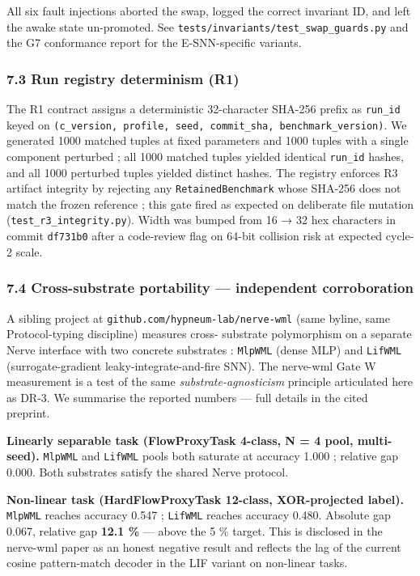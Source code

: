\documentclass[
]{article}
\begin{document}
All six fault injections aborted the swap, logged the correct invariant
ID, and left the awake state un-promoted. See
\texttt{tests/invariants/test\_swap\_guards.py} and the G7 conformance
report for the E-SNN-specific variants.

\subsubsection{7.3 Run registry determinism
(R1)}\label{run-registry-determinism-r1}

The R1 contract assigns a deterministic 32-character SHA-256 prefix as
\texttt{run\_id} keyed on
\texttt{(c\_version,\ profile,\ seed,\ commit\_sha,\ benchmark\_version)}.
We generated 1000 matched tuples at fixed parameters and 1000 tuples
with a single component perturbed ; all 1000 matched tuples yielded
identical \texttt{run\_id} hashes, and all 1000 perturbed tuples yielded
distinct hashes. The registry enforces R3 artifact integrity by
rejecting any \texttt{RetainedBenchmark} whose SHA-256 does not match
the frozen reference ; this gate fired as expected on deliberate file
mutation (\texttt{test\_r3\_integrity.py}). Width was bumped from 16 →
32 hex characters in commit \texttt{df731b0} after a code-review flag on
64-bit collision risk at expected cycle-2 scale.

\subsubsection{7.4 Cross-substrate portability --- independent
corroboration}\label{cross-substrate-portability-independent-corroboration}

A sibling project at \texttt{github.com/hypneum-lab/nerve-wml} (same
byline, same Protocol-typing discipline) measures cross- substrate
polymorphism on a separate Nerve interface with two concrete substrates
: \texttt{MlpWML} (dense MLP) and \texttt{LifWML} (surrogate-gradient
leaky-integrate-and-fire SNN). The nerve-wml Gate W measurement is a
test of the same \emph{substrate-agnosticism} principle articulated here
as DR-3. We summarise the reported numbers --- full details in the cited
preprint.

\textbf{Linearly separable task (FlowProxyTask 4-class, N = 4 pool,
multi-seed).} \texttt{MlpWML} and \texttt{LifWML} pools both saturate at
accuracy 1.000 ; relative gap 0.000. Both substrates satisfy the shared
Nerve protocol.

\textbf{Non-linear task (HardFlowProxyTask 12-class, XOR-projected
label).} \texttt{MlpWML} reaches accuracy 0.547 ; \texttt{LifWML}
reaches accuracy 0.480. Absolute gap 0.067, relative gap \textbf{12.1
\%} --- above the 5 \% target. This is disclosed in the nerve-wml paper
as an honest negative result and reflects the lag of the current cosine
pattern-match decoder in the LIF variant on non-linear tasks.
\end{document}

